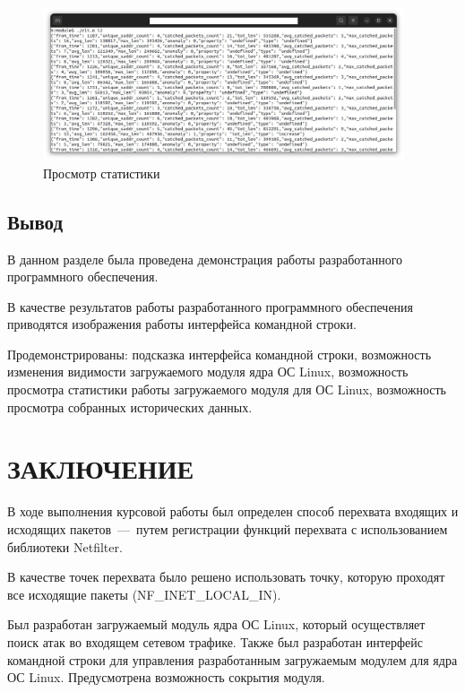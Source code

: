 \documentclass{bmstu}
\begin{document}
\begin{figure}[hbtp]
 \centering
 \includegraphics[width=0.95\textwidth]{inc/img/l2.png}
 \caption{Просмотр статистики}
 \label{img:l2}
\end{figure}

\section{Вывод}
В данном разделе была проведена демонстрация работы разработанного программного обеспечения.

В качестве результатов работы разработанного программного обеспечения приводятся изображения работы интерфейса командной строки.

Продемонстрированы: подсказка интерфейса командной строки, возможность изменения видимости загружаемого модуля ядра ОС Linux, возможность просмотра статистики работы загружаемого модуля для ОС Linux, возможность просмотра собранных исторических данных.


\chapter*{ЗАКЛЮЧЕНИЕ}

В ходе выполнения курсовой работы был определен способ перехвата входящих и исходящих пакетов~---~путем регистрации функций перехвата с использованием библиотеки Netfilter. 

В качестве точек перехвата было решено использовать точку, которую проходят все исходящие пакеты (NF\_INET\_LOCAL\_IN).

Был разработан загружаемый модуль ядра ОС Linux, который осуществляет поиск атак во входящем сетевом трафике. Также был разработан интерфейс командной строки для управления разработанным загружаемым модулем для ядра ОС Linux. Предусмотрена возможность сокрытия модуля.
\end{document}

